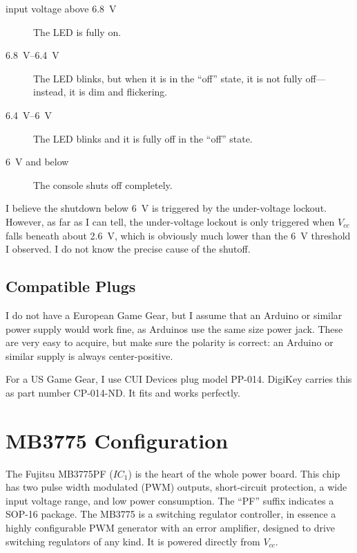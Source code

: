 \documentclass{article}
\newcommand{\Vcc}{$V_{cc}$}
\newcommand{\model}{\textsf}
\begin{document}
\begin{description}
\item[input voltage above \qty{6.8}{\volt}] The LED is fully on.
\item[\qty{6.8}{\volt}--\qty{6.4}{\volt}] The LED blinks, but when it
  is in the ``off'' state, it is not fully off---instead, it is dim
  and flickering.
\item[\qty{6.4}{\volt}--\qty{6}{\volt}] The LED blinks and it is fully
  off in the ``off'' state.
\item[\qty{6}{\volt} and below] The console shuts off completely.
\end{description}

I believe the shutdown below \qty{6}{\volt} is triggered by the
under-voltage lockout. However, as far as I can tell, the
under-voltage lockout is only triggered when \Vcc{} falls beneath
about \qty{2.6}{\volt}, which is obviously much lower than the
\qty{6}{\volt} threshold I observed. I do not know the precise
cause of the shutoff.


\subsection{Compatible Plugs}
I do not have a European Game Gear, but I assume that an Arduino or
similar power supply would work fine, as Arduinos use the same size
power jack. These are very easy to acquire, but make sure the polarity
is correct: an Arduino or similar supply is always center-positive.

For a US Game Gear, I use CUI Devices plug model
\model{PP-014}. DigiKey carries this as part number
\model{CP-014-ND}. It fits and works perfectly.

\section{\model{MB3775} Configuration}
The Fujitsu \model{MB3775PF} ($IC_1$) is the heart of the whole power
board. This chip has two pulse width modulated (PWM) outputs,
short-circuit protection, a wide input voltage range, and low power
consumption. The ``\model{PF}'' suffix indicates a \model{SOP-16}
package. The \model{MB3775} is a switching regulator controller, in
essence a highly configurable PWM generator with an error amplifier,
designed to drive switching regulators of any kind. It is powered
directly from \Vcc{}.
\end{document}
